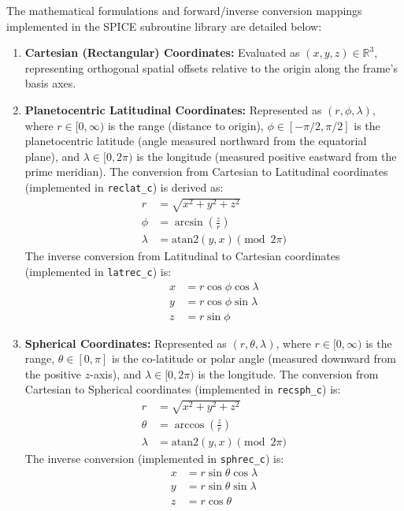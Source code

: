 \documentclass{acta}
\begin{document}
The mathematical formulations and forward/inverse conversion mappings implemented in the SPICE subroutine library are detailed below:

\begin{enumerate}
\item {\bf Cartesian (Rectangular) Coordinates:} Evaluated as $(x, y, z) \in \mathbb{R}^3$, representing orthogonal spatial offsets relative to the origin along the frame's basis axes.
\item {\bf Planetocentric Latitudinal Coordinates:} Represented as $(r, \phi, \lambda)$, where $r \in [0, \infty)$ is the range (distance to origin), $\phi \in [-\pi/2, \pi/2]$ is the planetocentric latitude (angle measured northward from the equatorial plane), and $\lambda \in [0, 2\pi)$ is the longitude (measured positive eastward from the prime meridian).
The conversion from Cartesian to Latitudinal coordinates (implemented in {\tt reclat\_c}) is derived as:
\begin{align}
r &= \sqrt{x^2 + y^2 + z^2} \\
\phi &= \arcsin\left(\frac{z}{r}\right) \\
\lambda &= \text{atan2}(y, x) \pmod{2\pi}
\end{align}
The inverse conversion from Latitudinal to Cartesian coordinates (implemented in {\tt latrec\_c}) is:
\begin{align}
x &= r \cos\phi \cos\lambda \\
y &= r \cos\phi \sin\lambda \\
z &= r \sin\phi
\end{align}

\item {\bf Spherical Coordinates:} Represented as $(r, \theta, \lambda)$, where $r \in [0, \infty)$ is the range, $\theta \in [0, \pi]$ is the co-latitude or polar angle (measured downward from the positive $z$-axis), and $\lambda \in [0, 2\pi)$ is the longitude.
The conversion from Cartesian to Spherical coordinates (implemented in {\tt recsph\_c}) is:
\begin{align}
r &= \sqrt{x^2 + y^2 + z^2} \\
\theta &= \arccos\left(\frac{z}{r}\right) \\
\lambda &= \text{atan2}(y, x) \pmod{2\pi}
\end{align}
The inverse conversion (implemented in {\tt sphrec\_c}) is:
\begin{align}
x &= r \sin\theta \cos\lambda \\
y &= r \sin\theta \sin\lambda \\
z &= r \cos\theta
\end{align}


\end{enumerate}
\end{document}
